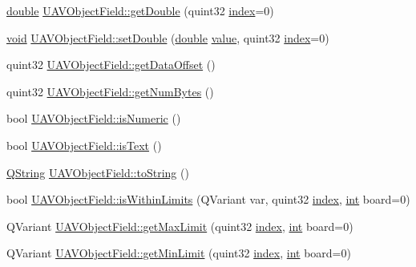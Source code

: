 \begin{DoxyCompactItemize}
\item 
\hyperlink{_super_l_u_support_8h_a8956b2b9f49bf918deed98379d159ca7}{double} \hyperlink{group___u_a_v_objects_plugin_gac189fe8172d3c25a937b7d0106025dfe}{U\-A\-V\-Object\-Field\-::get\-Double} (quint32 \hyperlink{glext_8h_ab47dd9958bcadea08866b42bf358e95e}{index}=0)
\item 
\hyperlink{group___u_a_v_objects_plugin_ga444cf2ff3f0ecbe028adce838d373f5c}{void} \hyperlink{group___u_a_v_objects_plugin_ga6c5e6a55d16226d0cfef0d2f512e243e}{U\-A\-V\-Object\-Field\-::set\-Double} (\hyperlink{_super_l_u_support_8h_a8956b2b9f49bf918deed98379d159ca7}{double} \hyperlink{glext_8h_aa0e2e9cea7f208d28acda0480144beb0}{value}, quint32 \hyperlink{glext_8h_ab47dd9958bcadea08866b42bf358e95e}{index}=0)
\item 
quint32 \hyperlink{group___u_a_v_objects_plugin_gaacffb4e86c637986046b656bb1e8219a}{U\-A\-V\-Object\-Field\-::get\-Data\-Offset} ()
\item 
quint32 \hyperlink{group___u_a_v_objects_plugin_ga872f22445800243679ca0860c3b8b7f1}{U\-A\-V\-Object\-Field\-::get\-Num\-Bytes} ()
\item 
bool \hyperlink{group___u_a_v_objects_plugin_ga5e1a07c1bc278bd1d8f1460ca08d13c7}{U\-A\-V\-Object\-Field\-::is\-Numeric} ()
\item 
bool \hyperlink{group___u_a_v_objects_plugin_ga6ad4eb36bd160d16bccdc494caf60938}{U\-A\-V\-Object\-Field\-::is\-Text} ()
\item 
\hyperlink{group___u_a_v_objects_plugin_gab9d252f49c333c94a72f97ce3105a32d}{Q\-String} \hyperlink{group___u_a_v_objects_plugin_ga149341e646b59250818f980dce9fd601}{U\-A\-V\-Object\-Field\-::to\-String} ()
\item 
bool \hyperlink{group___u_a_v_objects_plugin_gaab4e295f61848873ab0e45b3546a0035}{U\-A\-V\-Object\-Field\-::is\-Within\-Limits} (Q\-Variant var, quint32 \hyperlink{glext_8h_ab47dd9958bcadea08866b42bf358e95e}{index}, \hyperlink{ioapi_8h_a787fa3cf048117ba7123753c1e74fcd6}{int} board=0)
\item 
Q\-Variant \hyperlink{group___u_a_v_objects_plugin_gafbe9b468da7decca7c6ff46202b938ba}{U\-A\-V\-Object\-Field\-::get\-Max\-Limit} (quint32 \hyperlink{glext_8h_ab47dd9958bcadea08866b42bf358e95e}{index}, \hyperlink{ioapi_8h_a787fa3cf048117ba7123753c1e74fcd6}{int} board=0)
\item 
Q\-Variant \hyperlink{group___u_a_v_objects_plugin_ga3f6a930205ce76977ac96ffcfb864a8d}{U\-A\-V\-Object\-Field\-::get\-Min\-Limit} (quint32 \hyperlink{glext_8h_ab47dd9958bcadea08866b42bf358e95e}{index}, \hyperlink{ioapi_8h_a787fa3cf048117ba7123753c1e74fcd6}{int} board=0)

\end{DoxyCompactItemize}
